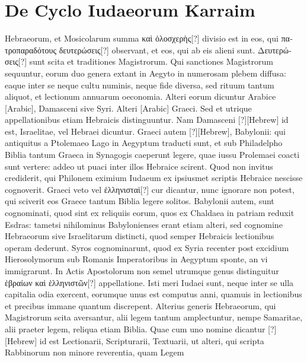\section{De Cyclo Iudaeorum Karraim}
%
Hebraeorum, et Mosicolarum summa \textgreek{καὶ ὁλοσχερὴς[?]}
 divisio est
in eos, qui \textgreek{πατροπαραδότους δευτερώσεις[?]} observant, et eos, qui
ab eis alieni sunt.
\textgreek{Δευτερώσεις[?]} sunt scita et traditiones Magistrorum.
Qui sanctiones Magistrorum sequuntur, eorum duo genera
extant in Aegyto in numerosam plebem diffusa: eaque inter se
neque cultu numinis, neque fide diversa, sed rituum tantum aliquot,
et lectionum annuarum oeconomia.
Alteri eorum dicuntur
Arabice \textarabic{}[Arabic], Damasceni sive Syri.
Alteri \textarabic{}[Arabic]
Graeci.
Sed et utrique appellationibus etiam Hebraicis distinguuntur.
Nam Damasceni \texthebrew{[?]}[Hebrew] id est, Israelitae,
 vel Hebraei dicuntur.
Graeci autem \texthebrew{[?]}[Hebrew], Babylonii:
 qui antiquitus a Ptolemaeo Lago
in Aegyptum traducti sunt, et sub Philadelpho Biblia tantum
Graeca in Synagogis caeperunt legere, quae iussu Prolemaei coacti sunt
vertere: addeo ut puaci inter illos Hebraice scirent.
Quod non invitus
crediderit, qui Philonem eximium Iudaeum ex ipsiusmet scriptis
Hebraice nescisse cognoverit.
Graeci veto vel \textgreek{ἑλληνισταὶ[?]} cur dicantur,
nunc ignorare non potest, qui sciverit eos Graece tantum Biblia
legere solitos.
Babylonii autem, sunt cognominati, quod sint ex reliquiis
eorum, quos ex Chaldaea in patriam reduxit Esdras: tametsi nihilominus
Babylonienses erant etiam alteri, sed cognomine Hebraeorum
sive Israelitarum distincti, quod semper Hebraicis lectionibus
operam dederunt.
Syros cognominarunt, quod ex Syria recenter
post excidium Hierosolymorum sub Romanis Imperatoribus in Aegyptum
sponte, an vi immigrarunt.
In Actis Apostolorum non semel
utrumque genus distinguitur \textgreek{ἑβραίων καὶ ἑλληνιστῶν[?]} appellatione.
Isti
meri Iudaei sunt, neque inter se ulla capitalia odia exercent, eorumque
unus est computus anni, quamuis in lectionibus et precibus
immane quantum discrepent.
Alterius generis Hebraeorum, qui
Magistrorum scita aversantur, alii legem tantum amplectuntur,
nempe Samaritae, alii praeter legem, reliqua etiam Biblia.
Quae cum
uno nomine dicantur \texthebrew{[?]}[Hebrew] id est Lectionarii,
 Scripturarii, Textuarii, ut
alteri, qui scripta Rabbinorum non minore reverentia, quam Legem
